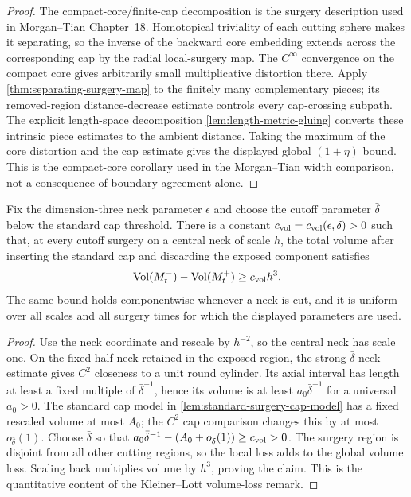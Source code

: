 \begin{proof}
The compact-core/finite-cap decomposition is the surgery description used in
Morgan--Tian Chapter~18.  Homotopical triviality of each cutting sphere makes
it separating, so the inverse of the backward core embedding extends across
the corresponding cap by the radial local-surgery map.  The $C^\infty$
convergence on the compact core
gives arbitrarily small multiplicative distortion there.  Apply
\ref{thm:separating-surgery-map} to the finitely many complementary pieces;
its removed-region distance-decrease estimate controls every cap-crossing
subpath.  The explicit length-space decomposition
\ref{lem:length-metric-gluing} converts these intrinsic piece estimates to
the ambient distance.  Taking the maximum of the core distortion and the cap
estimate gives the displayed global $(1+\eta)$ bound.  This is the compact-core
corollary used in the Morgan--Tian width comparison, not a consequence of
boundary agreement alone.
\end{proof}

\begin{lemma}
\label{lem:cutoff-surgery-volume-loss}
\notready
Fix the dimension-three neck parameter $\epsilon$ and choose the cutoff
parameter $\bar\delta$ below the standard cap threshold.  There is a constant
$c_{\rm vol}=c_{\rm vol}(\epsilon,\bar\delta)>0$ such that, at every cutoff
surgery on a central neck of scale $h$, the total volume after inserting the
standard cap and discarding the exposed component satisfies
\[
 \operatorname{Vol}(M_t^-)-\operatorname{Vol}(M_t^+)
 \ge c_{\rm vol}h^3.
\]
The same bound holds componentwise whenever a neck is cut, and it is uniform
over all scales and all surgery times for which the displayed parameters are
used.
\end{lemma}

\begin{proof}
Use the neck coordinate and rescale by $h^{-2}$, so the central neck has
scale one.  On the fixed half-neck retained in the exposed region, the strong
$\bar\delta$-neck estimate gives $C^2$ closeness to a unit round cylinder.
Its axial interval has length at least a fixed multiple of
$\bar\delta^{-1}$, hence its volume is at least
$a_0\bar\delta^{-1}$ for a universal $a_0>0$.  The standard cap model in
\ref{lem:standard-surgery-cap-model} has a fixed rescaled volume at most
$A_0$; the $C^2$ cap comparison changes this by at most $o_{\bar\delta}(1)$.
Choose $\bar\delta$ so that
$a_0\bar\delta^{-1}-(A_0+o_{\bar\delta}(1))\ge c_{\rm vol}>0$.
The surgery region is disjoint from all other cutting regions, so the local
loss adds to the global volume loss.  Scaling back multiplies volume by
$h^3$, proving the claim.  This is the quantitative content of the
Kleiner--Lott volume-loss remark.
\end{proof}

